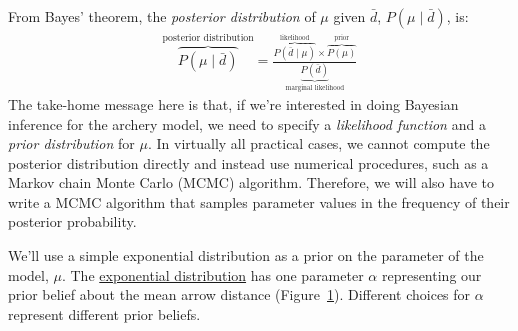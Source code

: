 From Bayes' theorem, the \emph{posterior distribution} of $\mu$ given $\bar d$, $P(\mu \mid \bar d)$, is:
\begin{align*}
\overbrace{P(\mu \mid \bar d)}^{\text{posterior distribution}} = \frac{ \overbrace{P(\bar d \mid \mu)}^{\text{likelihood}} \times \overbrace{P(\mu)}^{\text{prior}}}{\underbrace{P(\bar d)}_{\text{marginal likelihood}}}
\end{align*}
The take-home message here is that, if we're interested in doing Bayesian inference for the archery model, we need to specify a \emph{likelihood function} and a \emph{prior distribution} for $\mu$.
In virtually all practical cases, we cannot compute the posterior distribution directly and instead use numerical procedures, such as a Markov chain Monte Carlo (MCMC) algorithm.
Therefore, we will also have to write a MCMC algorithm that samples parameter values in the frequency of their posterior probability.

We'll use a simple exponential distribution as a prior on the parameter of the model, $\mu$.
The \href{https://en.wikipedia.org/wiki/Exponential_distribution}{exponential distribution} has one parameter $\alpha$ representing our prior belief about the mean arrow distance (Figure~\ref{fig:exponential_distribution}).
Different choices for $\alpha$ represent different prior beliefs.
\begin{figure}[h!]
\centering 
{}
\label{fig:exponential_distribution}
\end{figure}

